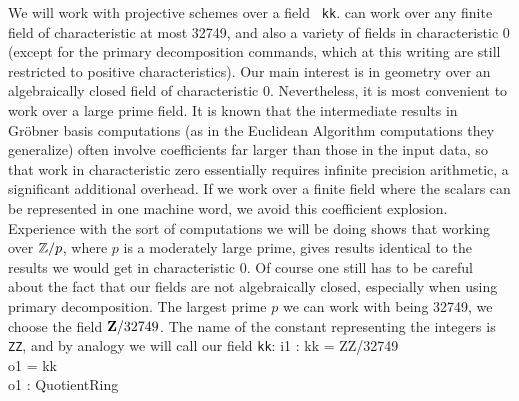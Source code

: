We will work with projective schemes over a field {\tt
kk}. \Mtwo can work over any finite field of characteristic at most
32749, and also a variety of fields in characteristic 0 (except for
the primary decomposition commands, which at this writing are still
restricted to positive characteristics). Our main interest is in
geometry over an algebraically closed field of characteristic
0. Nevertheless, it is most convenient to work over a large prime
{}field. 
It is known that the intermediate results in Gr\"obner basis
computations (as in the Euclidean Algorithm computations they
generalize) often involve coefficients far larger than those in the
input data, so that work in characteristic zero essentially requires
infinite precision arithmetic, a significant additional overhead. If
we work over a finite field where the scalars can be represented in
one machine word, we avoid this coefficient explosion. Experience with
the sort of computations we will be doing shows that working over
${\mathbb Z}/p$, where $p$ is a moderately large prime, gives results
identical to the results we would get in characteristic 0.
Of course one still
has to be careful about the fact that our fields are not
algebraically closed, especially when using primary
decomposition. The largest prime $p$ we can work with being 32749, we
choose the field ${\bf Z}/32749$. 
The name of the \Mtwo constant representing the
integers is {\tt ZZ}, and by analogy we will call our field {\tt kk}:
\beginOutput
i1 : kk = ZZ/32749\\
\emptyLine
o1 = kk\\
\emptyLine
o1 : QuotientRing\\
\endOutput

